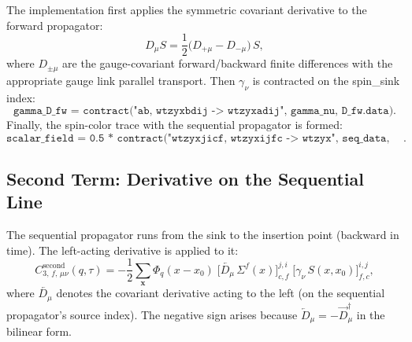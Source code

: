 \documentclass[11pt,a4paper]{article}
\newcommand{\Dmu}{D_{\mu}}
\newcommand{\seqprop}{\Sigma}
\newcommand{\fwprop}{S}
\newcommand{\xsrc}{x_{0}}
\newcommand{\xins}{x}
\newcommand{\momtrans}{q}
\begin{document}
The implementation first applies the symmetric covariant derivative to the forward
propagator:
\begin{equation}
  \Dmu\fwprop = \frac{1}{2}\big(D_{+\mu} - D_{-\mu}\big)\,\fwprop,
\end{equation}
where $D_{\pm\mu}$ are the gauge-covariant forward/backward finite differences
with the appropriate gauge link parallel transport.  Then $\gamma_{\nu}$ is
contracted on the spin\_sink index:
\begin{equation}
  \texttt{gamma\_D\_fw = contract("ab, wtzyxbdij -> wtzyxadij", gamma\_nu, D\_fw.data)}.
\end{equation}
Finally, the spin-color trace with the sequential propagator is formed:
\begin{equation}
  \texttt{scalar\_field = 0.5 * contract("wtzyxjicf, wtzyxijfc -> wtzyx",
    seq\_data, gamma\_D\_fw)}.
\end{equation}

\subsection{Second Term: Derivative on the Sequential Line}

The sequential propagator runs from the sink to the insertion point (backward in
time).  The left-acting derivative is applied to it:
\begin{equation}
  \boxed{
  C_{3,\,f,\,\mu\nu}^{\text{second}}(\momtrans,\tau)
  = -\frac{1}{2}\sum_{\mathbf{x}}
    \Phi_{\momtrans}(\xins-\xsrc)\;
    \big[\overleftarrow{\Dmu}\,\seqprop^{f}(x)\big]^{j,i}_{c,f}\;
    \big[\gamma_{\nu}\,\fwprop(x,\xsrc)\big]^{i,j}_{f,c},
  }
  \label{eq:C3_second}
\end{equation}
where $\overleftarrow{\Dmu}$ denotes the covariant derivative acting to the left
(on the sequential propagator's source index).  The negative sign arises because
$\overleftarrow{D}_{\mu} = -\overrightarrow{D}_{\mu}^{\dagger}$ in the bilinear
form.
\end{document}
